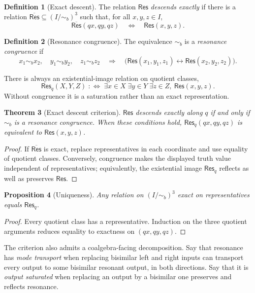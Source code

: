 \documentclass[11pt]{article}
\newtheorem{theorem}{Theorem}[section]
\newtheorem{proposition}[theorem]{Proposition}
\theoremstyle{definition}
\newtheorem{definition}[theorem]{Definition}
\newcommand{\Res}{\mathsf{Res}}
\newcommand{\Bis}{\mathrel{\sim_{\!b}}}
\newcommand{\Quot}{I/{\sim_{\!b}}}
\begin{document}
\begin{definition}[Exact descent]
The relation $\Res$ \emph{descends exactly} if there is a relation
$\overline{\Res}\subseteq(\Quot)^3$ such that, for all $x,y,z\in I$,
\[
 \overline{\Res}(q x,q y,q z)\quad\Longleftrightarrow\quad\Res(x,y,z).
\]
\end{definition}

\begin{definition}[Resonance congruence]
The equivalence $\Bis$ is a \emph{resonance congruence} if
\[
x_1\Bis x_2,\quad y_1\Bis y_2,\quad z_1\Bis z_2
\quad\Longrightarrow\quad
\bigl(\Res(x_1,y_1,z_1)\leftrightarrow\Res(x_2,y_2,z_2)\bigr).
\]
\end{definition}

There is always an existential-image relation on quotient classes,
\[
\Res_q(X,Y,Z)\;:\!\Longleftrightarrow\;
\exists x\in X\;\exists y\in Y\;\exists z\in Z,\ \Res(x,y,z).
\]
Without congruence it is a saturation rather than an exact representation.

\begin{theorem}[Exact descent criterion]\label{thm:descent}
$\Res$ descends exactly along $q$ if and only if $\Bis$ is a resonance
congruence.  When these conditions hold, $\Res_q(qx,qy,qz)$ is equivalent to
$\Res(x,y,z)$.
\end{theorem}

\begin{proof}
If $\overline{\Res}$ is exact, replace representatives in each coordinate and
use equality of quotient classes.  Conversely, congruence makes the displayed
truth value independent of representatives; equivalently, the existential
image $\Res_q$ reflects as well as preserves $\Res$.
\end{proof}

\begin{proposition}[Uniqueness]\label{prop:unique}
Any relation on $(\Quot)^3$ exact on representatives equals $\Res_q$.
\end{proposition}
\begin{proof}
Every quotient class has a representative.  Induction on the three quotient
arguments reduces equality to exactness on $(qx,qy,qz)$.
\end{proof}

The criterion also admits a coalgebra-facing decomposition.  Say that resonance
has \emph{mode transport} when replacing bisimilar left and right inputs can
transport every output to some bisimilar resonant output, in both directions.
Say that it is \emph{output saturated} when replacing an output by a bisimilar
one preserves and reflects resonance.
\end{document}
